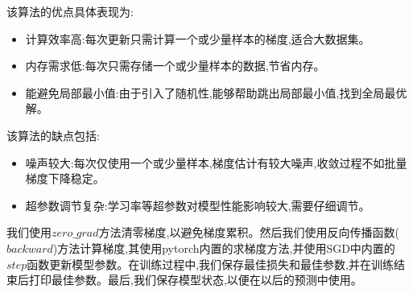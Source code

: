 该算法的优点具体表现为:

\begin{itemize}
    \item 计算效率高:每次更新只需计算一个或少量样本的梯度,适合大数据集。
    \item 内存需求低:每次只需存储一个或少量样本的数据,节省内存。
    \item 能避免局部最小值:由于引入了随机性,能够帮助跳出局部最小值,找到全局最优解。
\end{itemize}

该算法的缺点包括:

\begin{itemize}
    \item 噪声较大:每次仅使用一个或少量样本,梯度估计有较大噪声,收敛过程不如批量梯度下降稳定。
    \item 超参数调节复杂:学习率等超参数对模型性能影响较大,需要仔细调节。
\end{itemize}

    我们使用$zero\_grad$方法清零梯度,以避免梯度累积。然后我们使用反向传播函数($backward$)方法计算梯度,其使用pytorch内置的求梯度方法\cite{paszke2017automatic},并使用SGD中内置的$step$函数更新模型参数。在训练过程中,我们保存最佳损失和最佳参数,并在训练结束后打印最佳参数。最后,我们保存模型状态,以便在以后的预测中使用。
